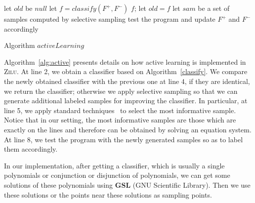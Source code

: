 
\begin{algorithm}[h]
\SetAlgoVlined
\Indm
{}
\Indp
let $old$ be $null$\;
 {
    let $f = classify(F^+, F^-)$\;
     {
        \Return $f$;
    }
    let $old = f$\;
    let $sam$ be a set of samples computed by selective sampling\;
    test the program and update $F^+$ and $F^-$ accordingly\;
}
\caption{Algorithm $activeLearning$}
\label{alg:active}
\end{algorithm}

Algorithm~\ref{alg:active} presents details on how active learning is implemented in \textsc{Zilu}. 
At line 2, we obtain a classifier based on Algorithm~\ref{classify}. 
We compare the newly obtained classifier with the previous one at line 4, if they are identical, we return the classifier; 
otherwise we apply selective sampling so that we can generate additional labeled samples for improving the classifier. 
In particular, at line 5, we apply standard techniques~\cite{DBLP:conf/icml/SchohnC00} to select the most informative sample. 
Notice that in our setting, the most informative samples are those which are exactly on the lines and therefore can be obtained by solving an equation system. 
At line 8, we test the program with the newly generated samples so as to label them accordingly.

In our implementation, after getting a classifier, which is usually a single polynomials or conjunction or disjunction of polynomials,
we can get some solutions of these polynomials using \textbf{GSL} (GNU Scientific Library).
Then we use these solutions or the points near these solutions as sampling points.
